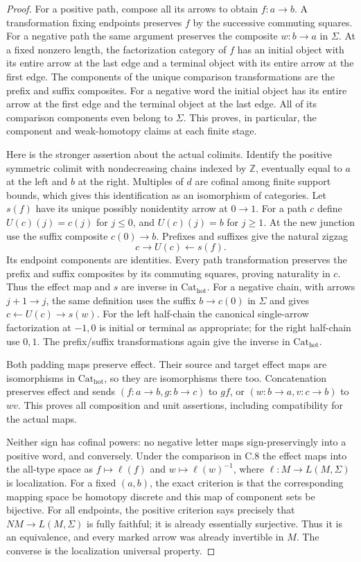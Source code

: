 \begin{proof}
For a positive path, compose all its arrows to obtain
$f:a\to b$. A transformation fixing endpoints preserves $f$ by
the successive commuting squares. For a negative path the same
argument preserves the composite $w:b\to a$ in $\Sigma$.
At a fixed nonzero length, the factorization category of $f$ has
an initial object with its entire arrow at the last edge and a
terminal object with its entire arrow at the first edge. The
components of the unique comparison transformations are the prefix
and suffix composites. For a negative word the initial object has
its entire arrow at the first edge and the terminal object at the
last edge. All of its comparison components even belong to $\Sigma$.
This proves, in particular, the component and weak-homotopy claims
at each finite stage.

Here is the stronger assertion about the actual colimits. Identify
the positive symmetric colimit with nondecreasing chains indexed by
$\mathbb Z$, eventually equal to $a$ at the left and $b$ at the
right. Multiples of $d$ are cofinal among finite support bounds,
which gives this identification as an isomorphism of categories.
Let $s(f)$ have its unique possibly nonidentity arrow at $0\to1$.
For a path $c$ define $U(c)(j)=c(j)$ for $j\leq0$, and
$U(c)(j)=b$ for $j\geq1$. At the new junction use the suffix
composite $c(0)\to b$. Prefixes and suffixes give the natural zigzag
\[
 c\longrightarrow U(c)\longleftarrow s(f).
\]
Its endpoint components are identities. Every path transformation
preserves the prefix and suffix composites by its commuting
squares, proving naturality in $c$. Thus the effect map and $s$
are inverse in $\mathrm{Cat}_{\mathrm{hot}}$. For a negative
chain, with arrows $j+1\to j$, the same definition uses the suffix
$b\to c(0)$ in $\Sigma$ and gives
$c\leftarrow U(c)\to s(w)$. For the left half-chain the canonical
single-arrow factorization at $-1,0$ is initial or terminal as
appropriate; for the right half-chain use $0,1$. The prefix/suffix
transformations again give the inverse in
$\mathrm{Cat}_{\mathrm{hot}}$.

Both padding maps preserve effect. Their source and target effect
maps are isomorphisms in $\mathrm{Cat}_{\mathrm{hot}}$, so they
are isomorphisms there too. Concatenation preserves effect and sends
$(f:a\to b,g:b\to c)$ to $gf$, or
$(w:b\to a,v:c\to b)$ to $wv$. This proves all composition and
unit assertions, including compatibility for the actual maps.

Neither sign has cofinal powers: no negative letter maps
sign-preservingly into a positive word, and conversely. Under the
comparison in C.8 the effect maps into the all-type space as
$f\mapsto\ell(f)$ and $w\mapsto\ell(w)^{-1}$, where
$\ell:M\to L(M,\Sigma)$ is localization. For a fixed $(a,b)$,
the exact criterion is that the corresponding mapping space be
homotopy discrete and this map of component sets be bijective.
For all endpoints, the positive criterion says precisely that
$NM\to L(M,\Sigma)$ is fully faithful; it is already essentially
surjective. Thus it is an equivalence, and every marked arrow was
already invertible in $M$. The converse is the localization
universal property.


\end{proof}
